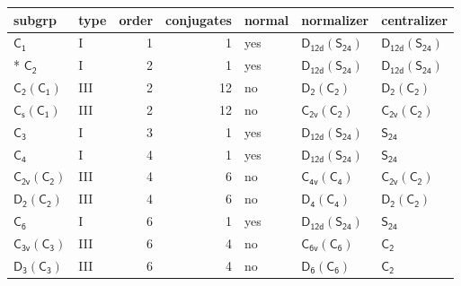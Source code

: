 \documentclass[10pt,a4paper]{article}
\numberwithin{equation}{section}
\newcommand{\grp}[1]{\mathsf{#1}}
\begin{document}
{\small\begin{longtable}{@{}llrrlll@{}}\toprule
subgrp & type & order & conjugates & normal & normalizer & centralizer\\\midrule\endhead
\bottomrule\endfoot\endlastfoot
\href{../../../rotation/data/pdf/C1.pdf}{$\grp{C_{1}}$} & I & 1 & 1 & yes & \href{D12d-S24.pdf}{$\grp{D_{12d}}(\grp{S_{24}})$} & \href{D12d-S24.pdf}{$\grp{D_{12d}}(\grp{S_{24}})$}\\*
\href{../../../rotation/data/pdf/C2.pdf}{$\grp{C_{2}}$} & I & 2 & 1 & yes & \href{D12d-S24.pdf}{$\grp{D_{12d}}(\grp{S_{24}})$} & \href{D12d-S24.pdf}{$\grp{D_{12d}}(\grp{S_{24}})$}\\
\href{C2-C1.pdf}{$\grp{C_{2}}(\grp{C_{1}})$} & III & 2 & 12 & no & \href{D2-C2.pdf}{$\grp{D_{2}}(\grp{C_{2}})$} & \href{D2-C2.pdf}{$\grp{D_{2}}(\grp{C_{2}})$}\\
\href{C1v-C1.pdf}{$\grp{C_{s}}(\grp{C_{1}})$} & III & 2 & 12 & no & \href{C2v-C2.pdf}{$\grp{C_{2v}}(\grp{C_{2}})$} & \href{C2v-C2.pdf}{$\grp{C_{2v}}(\grp{C_{2}})$}\\
\href{../../../rotation/data/pdf/C3.pdf}{$\grp{C_{3}}$} & I & 3 & 1 & yes & \href{D12d-S24.pdf}{$\grp{D_{12d}}(\grp{S_{24}})$} & \href{../../../rotation/data/pdf/S24.pdf}{$\grp{S_{24}}$}\\
\href{../../../rotation/data/pdf/C4.pdf}{$\grp{C_{4}}$} & I & 4 & 1 & yes & \href{D12d-S24.pdf}{$\grp{D_{12d}}(\grp{S_{24}})$} & \href{../../../rotation/data/pdf/S24.pdf}{$\grp{S_{24}}$}\\
\href{C2v-C2.pdf}{$\grp{C_{2v}}(\grp{C_{2}})$} & III & 4 & 6 & no & \href{C4v-C4.pdf}{$\grp{C_{4v}}(\grp{C_{4}})$} & \href{C2v-C2.pdf}{$\grp{C_{2v}}(\grp{C_{2}})$}\\
\href{D2-C2.pdf}{$\grp{D_{2}}(\grp{C_{2}})$} & III & 4 & 6 & no & \href{D4-C4.pdf}{$\grp{D_{4}}(\grp{C_{4}})$} & \href{D2-C2.pdf}{$\grp{D_{2}}(\grp{C_{2}})$}\\
\href{../../../rotation/data/pdf/C6.pdf}{$\grp{C_{6}}$} & I & 6 & 1 & yes & \href{D12d-S24.pdf}{$\grp{D_{12d}}(\grp{S_{24}})$} & \href{../../../rotation/data/pdf/S24.pdf}{$\grp{S_{24}}$}\\
\href{C3v-C3.pdf}{$\grp{C_{3v}}(\grp{C_{3}})$} & III & 6 & 4 & no & \href{C6v-C6.pdf}{$\grp{C_{6v}}(\grp{C_{6}})$} & \href{../../../rotation/data/pdf/C2.pdf}{$\grp{C_{2}}$}\\
\href{D3-C3.pdf}{$\grp{D_{3}}(\grp{C_{3}})$} & III & 6 & 4 & no & \href{D6-C6.pdf}{$\grp{D_{6}}(\grp{C_{6}})$} & \href{../../../rotation/data/pdf/C2.pdf}{$\grp{C_{2}}$}\\

\end{longtable}}
\end{document}
